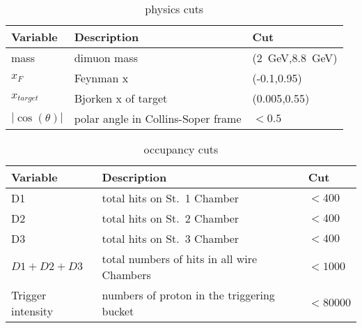 \documentclass[../main.tex]{subfiles}
\begin{document}
\begin{table}[h!]
	\centering
	\caption{ physics cuts}
	\label{table:physCut}
	\begin{tabular}{|m{4.5cm}|m{7cm}|m{3cm}|}
		\hline
		Variable         & Description                          & Cut                                                            \\ \hline
		mass             & dimuon mass                          & (\SI{2}{\GeV},\SI{8.8}{\GeV}) \footnotemark[1]\footnotemark[2] \\ \hline
		$x_F$            & Feynman x                            & (-0.1,0.95)                                                    \\ \hline
		$x_{target}$     & Bjorken x of target                  & (0.005,0.55)  \footnotemark[1]                                 \\ \hline
		$|\cos(\theta)|$ & polar angle in Collins-Soper   frame & $<0.5$                                                         \\ \hline
	\end{tabular}
\end{table}
\begin{table}[h!]
	\centering
	\caption{occupancy cuts}
	\label{table:occCut}
	\begin{tabular}{|m{4.5cm}|m{7cm}|m{3cm}|}
		\hline
		Variable                          & Description                                & Cut      \\ \hline
		D1                                & total hits on St.\ 1 Chamber               & $<400$   \\ \hline
		D2                                & total hits on St.\ 2 Chamber               & $<400$   \\ \hline
		D3                                & total hits on St.\ 3 Chamber               & $<400$   \\ \hline
		$D1+D2+D3$                        & total numbers of hits in all wire Chambers & $<1000$  \\ \hline
		Trigger intensity\footnotemark[3] & numbers of proton in the triggering bucket & $<80000$ \\ \hline
	\end{tabular}
\end{table}

\end{document}
